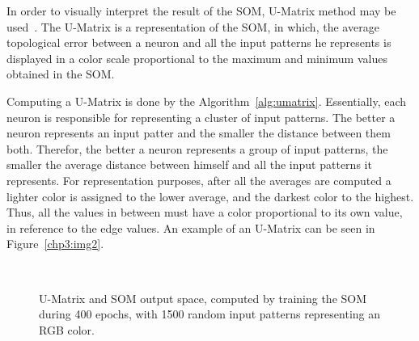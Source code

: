 In order to visually interpret the result of the \ac{SOM}, \ac{U-Matrix} method may be used~\citep{Bacao2005}. The \ac{U-Matrix} is a representation of the \ac{SOM}, in which, the average topological error between a neuron and all the input patterns he represents is displayed in a color scale proportional to the maximum and minimum values obtained in the \ac{SOM}. 

Computing a U-Matrix is done by the Algorithm~\ref{alg:umatrix}. Essentially, each neuron is responsible for representing a cluster of input patterns. The better a neuron represents an input patter and the smaller the distance between them both. Therefor, the better a neuron represents a group of input patterns, the smaller the average distance between himself and all the input patterns it represents. 
For representation purposes, after all the averages are computed a lighter color is assigned to the lower average, and the darkest color to the highest. Thus, all the values in between must have a color proportional to its own value, in reference to the edge values. An example of an \ac{U-Matrix} can be seen in Figure~\ref{chp3:img2}.

\begin{figure}[htpb]
  \centering
  \hspace*{0.5cm}
  \\
  \caption{U-Matrix and SOM output space, computed by training the SOM during 400 epochs, with 1500 random input patterns representing an RGB color.}
  \label{fig:umatrix_and_ouputspace}
\end{figure}

